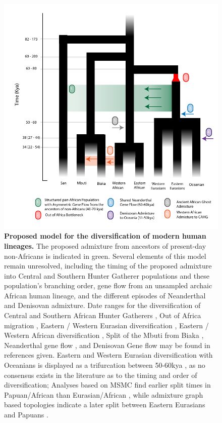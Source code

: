\documentclass{article}
\begin{document}
\begin{figure}
    \centering
    \includegraphics[width=\textwidth]{plot/simple_demography_v4.pdf}
    \caption{ {\bf Proposed model for the diversification of modern human lineages.}
    The proposed admixture from ancestors of present-day non-Africans is indicated in green.
    Several elements of this model remain unresolved, including the timing of the proposed admixture into Central and Southern Hunter Gatherer populations and these population's branching order, gene flow from an unsampled archaic African human lineage, and the different episodes of Neanderthal and Denisovan admixture. Date ranges for the diversification of Central and Southern African Hunter Gatherers \cite{Mallick2016}, Out of Africa migration \cite{Lipson2019}, Eastern / Western Eurasian diversification \cite{Schiffels2014a}, Eastern / Western African diversification \cite{Fan2019}, Split of the Mbuti from Biaka \cite{Mallick2016}, Neanderthal gene flow \cite{Sankararaman2012}, and Denisovan Gene flow \cite{Malaspinas2016} may be found in references given. Eastern and Western Eurasian diversification with Oceanians is displayed as a trifurcation between 50-60kya \cite{Schiffels2014}, as no consensus exists in the literature as to the timing and order of diversification; Analyses based on MSMC find earlier split times in Papuan/African than Eurasian/African \cite{Wang2019a, Malaspinas2016}, while admixture graph based topologies indicate a later split between Eastern Eurasians and Papuans \cite{Lipson2017}.}
    \label{fig:simple_dem}
\end{figure}
\end{document}
